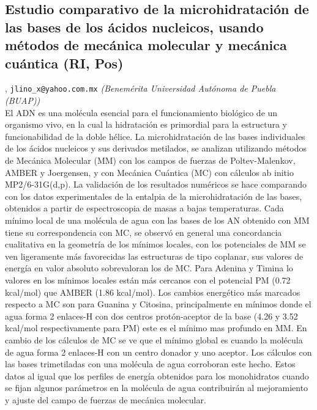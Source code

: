 \subsection{\sffamily Estudio comparativo de la microhidrataci\'on de las bases de los \'acidos nucleicos, usando m\'etodos de mec\'anica molecular y mec\'anica cu\'antica {\footnotesize (RI, Pos)}} \label{reg-1803} 
, {\tt jlino\_x@yahoo.com.mx}  {\slshape (Benem\'erita Universidad Aut\'onoma de Puebla (BUAP))}\\
          \noindent El ADN es una mol\'ecula esencial para el funcionamiento biol\'ogico de un organismo vivo, en la cual la hidrataci\'on es primordial para la estructura y funcionabilidad de la doble h\'elice. La microhidrataci\'on de las bases individuales de los \'acidos nucleicos y sus derivados metilados, se analizan utilizando m\'etodos de Mec\'anica Molecular (MM) con los campos de fuerzas de Poltev-Malenkov, AMBER y Joergensen, y con Mec\'anica Cu\'antica (MC) con c\'alculos ab initio MP2/6-31G(d,p). La validaci\'on de los resultados num\'ericos se hace comparando con los datos experimentales de la entalpia de la microhidrataci\'on de las bases, obtenidos a partir de espectroscopia de masas a bajas temperaturas. Cada m\'inimo local de una mol\'ecula de agua con las bases de los AN obtenido con MM tiene su correspondencia con MC,  se observ\'o  en general una concordancia cualitativa en la geometr\'ia de los m\'inimos locales, con los potenciales de MM se ven ligeramente m\'as favorecidas las estructuras de tipo coplanar, sus valores de energ\'ia en valor absoluto sobrevaloran los de MC. Para Adenina y Timina lo valores en los m\'inimos locales est\'an m\'as cercanos con el potencial PM (0.72 kcal/mol) que AMBER (1.86 kcal/mol). Los cambios energ\'etico m\'as marcados respecto a MC son para Guanina y Citosina, principalmente en m\'inimos donde el agua forma 2 enlaces-H con dos centros prot\'on-aceptor de la base (4.26 y 3.52 kcal/mol respectivamente para PM) este es el m\'inimo mas profundo en MM. En cambio de los c\'alculos de MC se ve que el m\'inimo global es cuando la mol\'ecula de agua forma 2 enlaces-H con  un centro donador y uno aceptor. Los c\'alculos con las bases trimetiladas con una mol\'ecula de agua corroboran este hecho. Estos datos al igual que los perfiles de energ\'ia obtenidos para los monohidratos cuando se fijan algunos par\'ametros en la mol\'ecula de agua contribuir\'an al mejoramiento y ajuste del campo de fuerzas de mec\'anica molecular.
